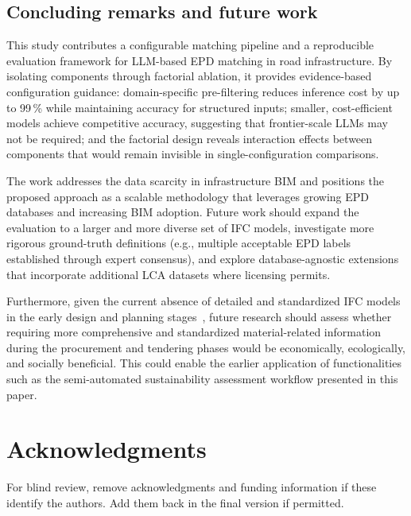 \documentclass[10pt, a4paper, twocolumn]{article}
\begin{document}
\subsection{Concluding remarks and future work}

This study contributes a configurable matching pipeline and a reproducible
evaluation framework for LLM-based EPD matching in road infrastructure. By
isolating components through factorial ablation, it provides evidence-based
configuration guidance: domain-specific pre-filtering reduces inference cost by up
to 99\,\% while maintaining accuracy for structured inputs; smaller, cost-efficient
models achieve competitive accuracy, suggesting that frontier-scale LLMs may not be
required; and the factorial design reveals interaction effects between components
that would remain invisible in single-configuration comparisons.

The work addresses the data scarcity in infrastructure BIM and positions the
proposed approach as a scalable methodology that leverages growing EPD databases
and increasing BIM adoption. Future work should expand the evaluation to a larger
and more diverse set of IFC models, investigate more rigorous ground-truth
definitions (e.g., multiple acceptable EPD labels established through expert
consensus), and explore database-agnostic extensions that incorporate additional
LCA datasets where licensing permits.

Furthermore, given the current absence of detailed and standardized IFC models in the early design and planning stages~\cite{RWTHAachenUniversity.2025}, future research should assess whether requiring more comprehensive and standardized material-related information during the procurement and tendering phases would be economically, ecologically, and socially beneficial.  This could enable the earlier application of functionalities such as the semi-automated sustainability assessment workflow presented in this paper. 

\section*{Acknowledgments}

For blind review, remove acknowledgments and funding information if these
identify the authors. Add them back in the final version if permitted.






\end{document}
